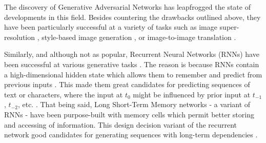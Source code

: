 \documentclass[a4paper]{book}
\begin{document}
The discovery of Generative Adversarial Networks \parencite[GANs;][]{goodfellow_generative_2014} has leapfrogged the state of developments in this field. Besides countering the drawbacks outlined above, they have been particularly successful at a variety of tasks such as image super-resolution \parencite[; see Figure \ref{fig:srgan}]{ledig_photo-realistic_2016}, style-based image generation \parencite{karras_style-based_2018}, or image-to-image translation \parencite[such as converting a satellite image into a map, or a sketch into a photorealistic image;][;see Figure \ref{fig:pix2pix}]{isola_image--image_2016}.

Similarly, and although not as popular, Recurrent Neural Networks (RNNs) have been successful at various generative tasks \parencite{jenal_rnn-based_2019, ICML2011Sutskever_524}. The reason is because RNNs contain a high-dimensional hidden state which allows them to remember and predict from previous inputs \parencite{ICML2011Sutskever_524}. This made them great candidates for predicting sequences \parencite{graves_generating_2013} of text or characters, where the input at $t_0$ might be influenced by prior input at $t_{-1}$, $t_{-2}$, etc. \parencite{fan_tts_2014}. That being said, Long Short-Term Memory networks \parencite[LSTM;][]{hochreiter_long_1997} - a variant of RNNs - have been purpose-built with memory cells which permit better storing and accessing of information. This design decision variant of the recurrent network good candidates for generating sequences with long-term dependencies \parencite{graves_generating_2013}.
\end{document}
